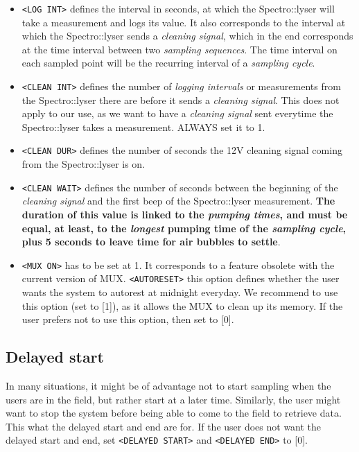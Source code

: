 \documentclass[]{book}
\providecommand{\tightlist}{%
  \setlength{\itemsep}{0pt}\setlength{\parskip}{0pt}}
\begin{document}
\begin{itemize}
\tightlist
\item
  \texttt{\textless{}LOG\ INT\textgreater{}} defines the interval in seconds, at which the Spectro::lyser will take a measurement and logs its value. It also corresponds to the interval at which the Spectro::lyser sends a \emph{cleaning signal}, which in the end corresponds at the time interval between two \emph{sampling sequences}. The time interval on each sampled point will be the recurring interval of a \emph{sampling cycle}.
\item
  \texttt{\textless{}CLEAN\ INT\textgreater{}} defines the number of \emph{logging intervals} or measurements from the Spectro::lyser there are before it sends a \emph{cleaning signal}. This does not apply to our use, as we want to have a \emph{cleaning signal} sent everytime the Spectro::lyser takes a measurement. ALWAYS set it to 1.
\item
  \texttt{\textless{}CLEAN\ DUR\textgreater{}} defines the number of seconds the 12V cleaning signal coming from the Spectro::lyser is on.
\item
  \texttt{\textless{}CLEAN\ WAIT\textgreater{}} defines the number of seconds between the beginning of the \emph{cleaning signal} and the first beep of the Spectro::lyser measurement. \textbf{The duration of this value is linked to the \emph{pumping times}, and must be equal, at least, to the \emph{longest} pumping time of the \emph{sampling cycle}, plus 5 seconds to leave time for air bubbles to settle}.
\item
  \texttt{\textless{}MUX\ ON\textgreater{}} has to be set at 1. It corresponds to a feature obsolete with the current version of MUX.
  \texttt{\textless{}AUTORESET\textgreater{}} this option defines whether the user wants the system to autorest at midnight everyday. We recommend to use this option (set to {[}1{]}), as it allows the MUX to clean up its memory. If the user prefers not to use this option, then set to {[}0{]}.
\end{itemize}

\hypertarget{delayed-start}{%
\subsection{Delayed start}\label{delayed-start}}

In many situations, it might be of advantage not to start sampling when the users are in the field, but rather start at a later time. Similarly, the user might want to stop the system before being able to come to the field to retrieve data. This what the delayed start and end are for. If the user does not want the delayed start and end, set \texttt{\textless{}DELAYED\ START\textgreater{}} and \texttt{\textless{}DELAYED\ END\textgreater{}} to {[}0{]}.
\end{document}
